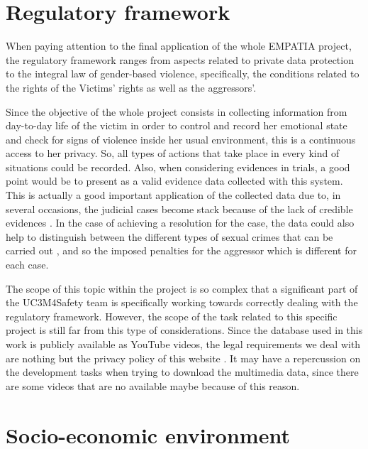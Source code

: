 \section{Regulatory framework}

	When paying attention to the final application of the whole EMPATIA project, the regulatory framework ranges from aspects related to private data protection to the integral law of gender-based violence, specifically, the conditions related to the rights of the Victims' rights as well as the aggressors'. 
	
	Since the objective of the whole project consists in collecting information from day-to-day life of the victim in order to control and record her emotional state and check for signs of violence inside her usual environment, this is a continuous access to her privacy. So, all types of actions that take place in every kind of situations could be recorded. Also, when considering evidences in trials, a good point would be to present as a valid evidence data collected with this system. This is actually a good important application of the collected data due to, in several occasions, the judicial cases become stack because of the lack of credible evidences \cite{UC3M4SafetyTeam2018}. In the case of achieving a resolution for the case, the data could also help to distinguish between the different types of sexual crimes that can be carried out \cite{Baldwin}, and so the imposed penalties for the aggressor which is different for each case.
	
	The scope of this topic within the project is so complex that a significant part of the UC3M4Safety team is specifically working towards correctly dealing with the regulatory framework. %
	However, the scope of the task related to this specific project is still far from this type of considerations. Since the database used in this work is publicly available as YouTube videos, the legal requirements we deal with are nothing but the privacy policy of this website \cite{Goetzparterns}. It may have a repercussion on the development tasks when trying to download the multimedia data, since there are some videos that are no available maybe because of this reason. 

\section{Socio-economic environment}
	
